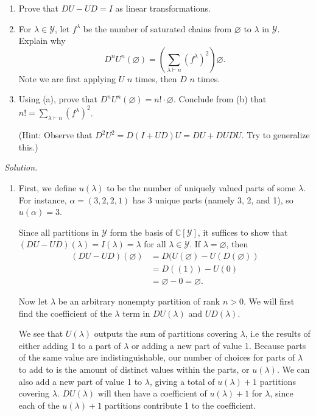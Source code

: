 \documentclass[11pt,letterpaper,dvipsnames]{article}
\newenvironment{solution}{\color{BlueViolet}\textit{Solution.}}{\color{black}}
\begin{document}
\begin{enumerate}
	\begin{enumerate}
		\item Prove that $DU - UD = I$ as linear transformations.
		\item 
		For $\lambda \in \mathcal{Y}$, let $f^\lambda$ be the number of saturated chains from $\varnothing$ to $\lambda$ in $\mathcal{Y}$.
		Explain why
		\[
		D^nU^n(\varnothing) = \left(\sum_{\lambda \vdash n} (f^\lambda)^2\right) \varnothing.
		\]
		Note we are first applying $U$ $n$ times, then $D$ $n$ times.
		 
		
		\item Using (a), prove that $D^nU^n(\varnothing) = n! \cdot \varnothing$.
		Conclude from (b) that $n! = \sum_{\lambda \vdash n} (f^\lambda)^2$.
		
		(Hint: Observe that $D^2U^2 = D(I + UD)U = DU + DUDU$. Try to generalize this.)
	\end{enumerate}
	
	\begin{solution}
		\begin{enumerate}
			\item 
			First, we define $u(\lambda)$ to be the number of uniquely valued parts of some $\lambda$. For instance, $\alpha =(3,2,2,1)$ has 3 unique parts (namely 3, 2, and 1), so $u(\alpha)=3$. 

			Since all partitions in $\mathcal{Y}$ form the basis of $\mathbb{C}[\mathcal{Y}]$, it suffices to show that $(DU-UD)(\lambda)=I(\lambda)=\lambda$ for all $\lambda \in \mathcal{Y}$. If $\lambda=\varnothing$, then
			\begin{align*}
				(DU-UD)(\varnothing)&=D(U(\varnothing)-U(D(\varnothing)) \\
				&=D((1))-U(0) \\
				&=\varnothing-0=\varnothing.
			\end{align*}
			
			Now let $\lambda$ be an arbitrary nonempty partition of rank $n>0$. We will first find the coefficient of the $\lambda$ term in $DU(\lambda)$ and $UD(\lambda)$.

			We see that $U(\lambda)$ outputs the sum of partitions covering $\lambda$, i.e the results of either adding 1 to a part of $\lambda$ or adding a new part of value 1. 
			Because parts of the same value are indistinguishable, our number of choices for parts of $\lambda$ to add to is the amount of distinct values within the parts, or $u(\lambda)$. We can also add a new part of value 1 to $\lambda$, giving a total of $u(\lambda)+1$ partitions covering $\lambda$. $DU(\lambda)$ will then have a coefficient of $u(\lambda)+1$ for $\lambda$, since each of the $u(\lambda)+1$ partitions contribute 1 to the coefficient.


\end{enumerate}
\end{solution}
\end{enumerate}
\end{document}
